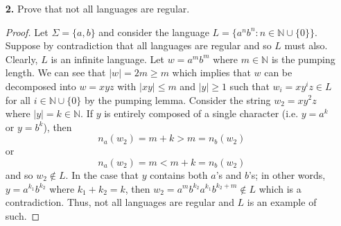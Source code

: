 \documentclass[ 12pt ]{article}
\begin{document}
\begin{enumerate}
\begin{proof}[Solution]
			Overall, the main differences between these machines is their methods of memory storage and their levels of determinism. The dfa is the the simplest of all listed machines;
			this is because it has no memory other than its finite states. Similarly, an nfa also uses only its finite states as memory. What distinguishes these two machines is the
			determinism of how the machines will react to a given input; for a dfa, we can determine the exact course of action for any given string while it is unclear how an nfa may
			react since it may transition to a variety of finite states at any step. What is interesting specifically between these two is that they generate the same languages despite
			their varying levels of determinism. In regard to the more sophisticated machines, both the npda and tm utilize data structures to store infinite memory which allows them to
			generate far more complex languages. Moreover, an npda uses a stack while a tm uses a tape. Additionally, it is notable that the npda is nondeterministic which is a
			similarity both the nfa and npda share. A unique detail of tms is that they have both an input and output (although the lines between them are often blurred) unlike all other
			listed machines since they are simply acceptors.
		\end{proof}


	\item[\textbf{2.}] Prove that not all languages are regular.

		\begin{proof}
			Let $\Sigma = \{ a, b \}$ and consider the language $L = \{ a^n b^n : n \in \mathbb{N} \cup \{ 0 \} \}$. Suppose by contradiction that all languages are regular and so $L$
			must also. Clearly, $L$ is an infinite language. Let $w = a^m b^m$ where $m \in \mathbb{N}$ is the pumping length. We can see that $|w| = 2m \geq m$ which implies that $w$
			can be decomposed into $w = xyz$ with $|xy| \leq m$ and $|y| \geq 1$ such that $w_i = xy^iz \in L$ for all $i \in \mathbb{N} \cup \{ 0 \}$ by the pumping lemma. Consider
			the string $w_2 = xy^2z$ where $|y| = k \in \mathbb{N}$. If $y$ is entirely composed of a single character (i.e. $y = a^k$ or $y = b^k$), then $$n_a(w_2) = m + k > m =
			n_b(w_2)$$ or $$n_a(w_2) = m < m + k = n_b(w_2)$$ and so $w_2 \notin L$. In the case that $y$ contains both $a$'s and $b$'s; in other words, $y = a^{k_1}b^{k_2}$ where $k_1
			+ k_2 = k$, then $w_2 = a^m b^{k_2} a^{k_1} b^{k_2 + m} \notin L$ which is a contradiction. Thus, not all languages are regular and $L$ is an example of such.
		\end{proof}



\end{enumerate}
\end{document}
